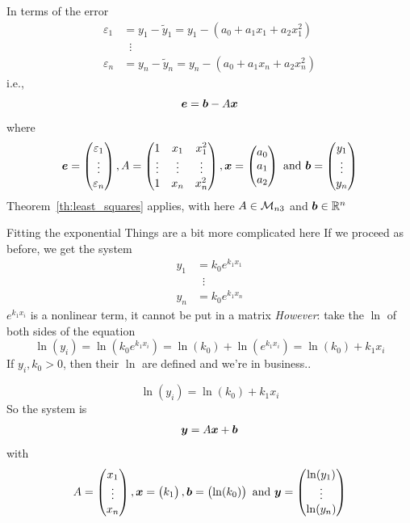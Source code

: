 \documentclass[aspectratio=169]{beamer}
\begin{document}
\begin{frame}
In terms of the error
\begin{align*}
\varepsilon_1 &= y_1-\tilde y_1 = y_1-(a_0+a_1x_1+a_2x_1^2) \\
&\;\;\vdots\\
\varepsilon_n &= y_n-\tilde y_n = y_n-(a_0+a_1x_n+a_2x_n^2)
\end{align*}
i.e.,
\[
\bm{e} = \bm{b}-A\bm{x} 
\]
where
\[
\bm{e} = \begin{pmatrix}
\varepsilon_1\\ \vdots\\ \varepsilon_n
\end{pmatrix},
A=\begin{pmatrix}
1 & x_1 & x_1^2\\ \vdots & \vdots & \vdots \\ 1 & x_n & x_n^2
\end{pmatrix},
\bm{x} = \begin{pmatrix}
a_0\\a_1\\a_2
\end{pmatrix}\textrm{ and }
\bm{b} = \begin{pmatrix}
y_1\\ \vdots\\ y_n
\end{pmatrix}
\]
\vfill
Theorem~\ref{th:least_squares} applies, with here $A\in\mathcal{M}_{n3}$ and $\bm{b}\in\mathbb{R}^n$
\end{frame}


\begin{frame}{Fitting the exponential}
Things are a bit more complicated here
\vfill
If we proceed as before, we get the system
\begin{align*}
y_1 &= k_0 e^{k_1x_1} \\
&\;\;\vdots \\
y_n &= k_0 e^{k_1x_n}
\end{align*}
$e^{k_1x_i}$ is a nonlinear term, it cannot be put in a matrix
\vfill
\emph{However}: take the $\ln$ of both sides of the equation
\[
\ln(y_i) = \ln(k_0e^{k_1x_i}) = \ln(k_0)+\ln(e^{k_1x_i}) = \ln(k_0)+k_1x_i
\]
If $y_i,k_0>0$, then their $\ln$ are defined and we're in business..
\end{frame}

\begin{frame}
\[
\ln(y_i) = \ln (k_0)+k_1x_i
\]
So the system is
\begin{align*}
\bm{y} = A\bm{x}+\bm{b}
\end{align*}
with
\[
A = \begin{pmatrix}
x_1\\ \vdots \\ x_n
\end{pmatrix},
\bm{x} = \begin{pmatrix}
k_1
\end{pmatrix},
\bm{b} = \begin{pmatrix}
\ln (k_0)
\end{pmatrix}
\textrm{ and }
\bm{y} = \begin{pmatrix}
\ln (y_1)\\ \vdots\\ \ln (y_n)
\end{pmatrix}
\]
\end{frame}
\end{document}
